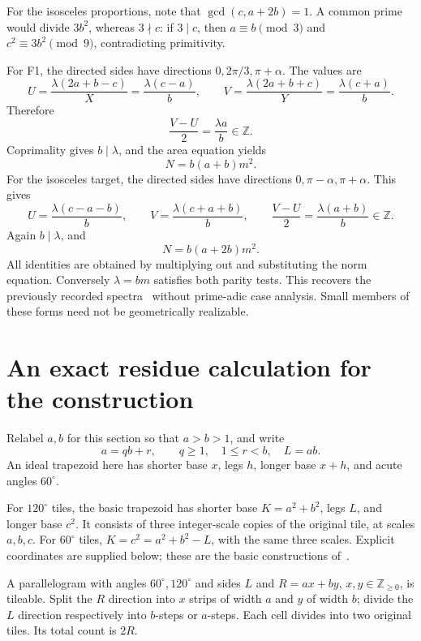 \documentclass[11pt]{article}
\newcommand{\Z}{\mathbb Z}
\newcommand{\NN}{\mathbb Z_{\ge0}}
\begin{document}
For the isosceles proportions, note that $\gcd(c,a+2b)=1$. A common prime would divide $3b^2$, whereas $3\nmid c$: if $3\mid c$, then $a\equiv b\pmod3$ and $c^2\equiv3b^2\pmod9$, contradicting primitivity.

For F1, the directed sides have directions $0,2\pi/3,\pi+\alpha$. The values are
\[
 U=\frac{\lambda(2a+b-c)}X=\frac{\lambda(c-a)}b,
 \qquad
 V=\frac{\lambda(2a+b+c)}Y=\frac{\lambda(c+a)}b.
\]
Therefore
\[
\frac{V-U}{2}=\frac{\lambda a}{b}\in\Z.
\]
Coprimality gives $b\mid\lambda$, and the area equation yields
\begin{equation}
N=b(a+b)m^2.\label{eq:f1}
\end{equation}
For the isosceles target, the directed sides have directions $0,\pi-\alpha,\pi+\alpha$. This gives
\[
 U=\frac{\lambda(c-a-b)}b,\qquad
 V=\frac{\lambda(c+a+b)}b,
 \qquad \frac{V-U}{2}=\frac{\lambda(a+b)}b\in\Z.
\]
Again $b\mid\lambda$, and
\begin{equation}
N=b(a+2b)m^2.\label{eq:iso}
\end{equation}
All identities are obtained by multiplying out and substituting the norm equation. Conversely $\lambda=bm$ satisfies both parity tests. This recovers the previously recorded spectra~\cite{Bonfioli} without prime-adic case analysis. Small members of these forms need not be geometrically realizable.

\section{An exact residue calculation for the construction}
Relabel $a,b$ for this section so that $a>b>1$, and write
\[
a=qb+r,\qquad q\ge1,\quad1\le r<b,\quad L=ab.
\]
An ideal trapezoid here has shorter base $x$, legs $h$, longer base $x+h$, and acute angles $60^\circ$.

For $120^\circ$ tiles, the basic trapezoid has shorter base $K=a^2+b^2$, legs $L$, and longer base $c^2$. It consists of three integer-scale copies of the original tile, at scales $a,b,c$. For $60^\circ$ tiles, $K=c^2=a^2+b^2-L$, with the same three scales. Explicit coordinates are supplied below; these are the basic constructions of~\cite{Zhang}.

A parallelogram with angles $60^\circ,120^\circ$ and sides $L$ and $R=ax+by$, $x,y\in\NN$, is tileable. Split the $R$ direction into $x$ strips of width $a$ and $y$ of width $b$; divide the $L$ direction respectively into $b$-steps or $a$-steps. Each cell divides into two original tiles. Its total count is $2R$.
\end{document}
